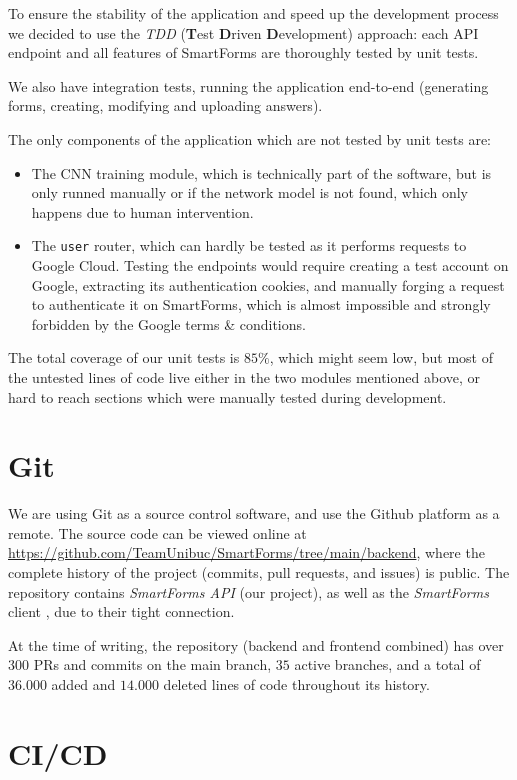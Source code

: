 \documentclass[11pt, a4paper]{report}
\def\code#1{\texttt{#1}}
\begin{document}
To ensure the stability of the application and speed up the development process we decided to use the \textit{TDD} (\textbf{T}est \textbf{D}riven \textbf{D}evelopment) approach: each API endpoint and all features of SmartForms are thoroughly tested by unit tests.

We also have integration tests, running the application end-to-end (generating forms, creating, modifying and uploading answers).

The only components of the application which are not tested by unit tests are:
\begin{itemize}
	\item The CNN training module, which is technically part of the software, but is only runned manually or if the network model is not found, which only happens due to human intervention.
	\item The \code{user} router, which can hardly be tested as it performs requests to Google Cloud. Testing the endpoints would require creating a test account on Google, extracting its authentication cookies, and manually forging a request to authenticate it on SmartForms, which is almost impossible and strongly forbidden by the Google terms \& conditions. 
\end{itemize}

The total coverage of our unit tests is $85\%$, which might seem low, but most of the untested lines of code live either in the two modules mentioned above, or hard to reach sections which were manually tested during development.

\section{Git}

We are using Git\cite{Git} as a source control software, and use the Github platform as a remote. The source code can be viewed online at \url{https://github.com/TeamUnibuc/SmartForms/tree/main/backend}, where the complete history of the project (commits, pull requests, and issues) is public. The repository contains \textit{SmartForms API} (our project), as well as the \textit{SmartForms} client \cite{felix}, due to their tight connection.

At the time of writing, the repository (backend and frontend combined) has over $300$ PRs and commits on the main branch, $35$ active branches, and a total of $36.000$ added and $14.000$ deleted lines of code throughout its history. 


\section{CI/CD}
\end{document}
